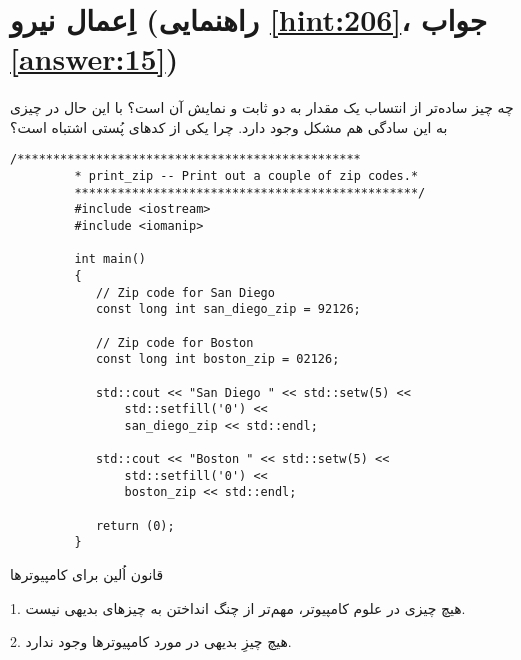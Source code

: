 \section[اِعمال نیرو]{اِعمال نیرو \protect{} (راهنمایی \ref{hint:206}، جواب \ref{answer:15})}
\paragraph{}\label{prog:62}
چه چیز ساده‌تر از انتساب یک مقدار به دو ثابت و نمایش آن است؟ با این حال در چیزی به این سادگی هم مشکل وجود دارد. چرا یکی از کدهای پُستی اشتباه است؟

\begin{LTR}
    \begin{lstlisting}[style=C++Style]
         /************************************************
         * print_zip -- Print out a couple of zip codes.*
         ************************************************/
         #include <iostream>
         #include <iomanip>

         int main()
         {
         	// Zip code for San Diego
         	const long int san_diego_zip = 92126;

         	// Zip code for Boston
         	const long int boston_zip = 02126;

         	std::cout << "San Diego " << std::setw(5) <<
         		std::setfill('0') <<
         		san_diego_zip << std::endl;

         	std::cout << "Boston " << std::setw(5) <<
         		std::setfill('0') <<
         		boston_zip << std::endl;

         	return (0);
         }
    \end{lstlisting}
\end{LTR}

\begin{tcolorbox}
    \centering
    قانون اُلین برای کامپیوترها

    \raggedright
    1. هیچ چیزی در علوم کامپیوتر، مهم‌تر از چنگ انداختن به چیزهای بدیهی نیست.

    2. هیچ چیزِ بدیهی در مورد کامپیوترها وجود ندارد.
\end{tcolorbox}